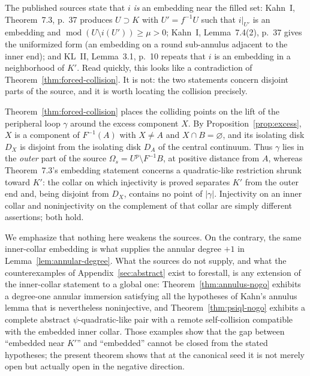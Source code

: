 \begin{remark}
\label{rem:collar-compat}
The published sources state that \(i\) \emph{is} an embedding near the
filled set: Kahn~I, Theorem~7.3, p.~37 produces \(U\supset K\) with
\(U'=f^{-1}U\) such that \(i|_{U'}\) is an embedding and
\(\operatorname{mod}(U\setminus i(U'))\ge\mu>0\); Kahn~I,
Lemma~7.4(2), p.~37 gives the uniformized form (an embedding on a round
sub-annulus adjacent to the inner end); and KL~II, Lemma~3.1, p.~10
repeats that \(i\) is an embedding in a neighborhood of \(K'\).  Read
quickly, this looks like a contradiction of
Theorem~\ref{thm:forced-collision}.  It is not: the two statements
concern disjoint parts of the source, and it is worth locating the
collision precisely.

Theorem~\ref{thm:forced-collision} places the colliding points on the
lift of the peripheral loop \(\gamma\) around the excess component
\(X\).  By Proposition~\ref{prop:excess}, \(X\) is a component of
\(F^{-1}(A)\) with \(X\neq A\) and \(X\cap B=\varnothing\), and its
isolating disk \(D_X\) is disjoint from the isolating disk \(D_A\) of
the central continuum.  Thus \(\gamma\) lies in the \emph{outer} part
of the source \(\Omega_s=U^{p}\setminus F^{-1}B\), at positive
distance from \(A\), whereas Theorem~7.3's embedding statement
concerns a quadratic-like restriction shrunk toward \(K'\): the
collar on which injectivity is proved separates \(K'\) from the outer
end and, being disjoint from \(D_X\), contains no point of
\(|\gamma|\).  Injectivity on an inner collar and noninjectivity on
the complement of that collar are simply different assertions; both
hold.

We emphasize that nothing here weakens the sources.  On the contrary,
the same inner-collar embedding is what supplies the annular degree
\(+1\) in Lemma~\ref{lem:annular-degree}.  What the sources do not
supply, and what the counterexamples of
Appendix~\ref{sec:abstract} exist to forestall, is any extension of
the inner-collar statement to a global one: Theorem~\ref{thm:annulus-nogo}
exhibits a degree-one annular immersion satisfying all the hypotheses
of Kahn's annulus lemma that is nevertheless noninjective, and
Theorem~\ref{thm:psiql-nogo} exhibits a complete abstract
\(\psi\)-quadratic-like pair with a remote self-collision compatible
with the embedded inner collar.  Those examples show that the gap
between ``embedded near \(K'\)'' and ``embedded'' cannot be closed
from the stated hypotheses; the present theorem shows that at the
canonical seed it is not merely open but actually open in the
negative direction.
\end{remark}
